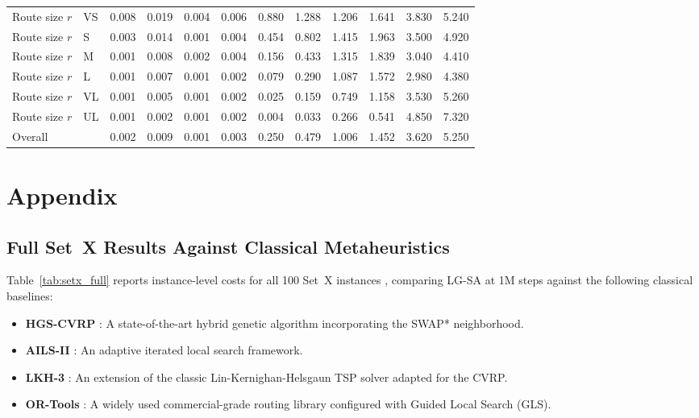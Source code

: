 \documentclass[letterpaper]{article} %
\begin{document}
\begin{table}[t]
\begin{tabular}{llrrrrrrrrrr}
Route size $r$ & VS & 0.008 & 0.019 & 0.004 & 0.006 & 0.880 & 1.288 & 1.206 & 1.641 & 3.830 & 5.240 \\
Route size $r$ & S & 0.003 & 0.014 & 0.001 & 0.004 & 0.454 & 0.802 & 1.415 & 1.963 & 3.500 & 4.920 \\
Route size $r$ & M & 0.001 & 0.008 & 0.002 & 0.004 & 0.156 & 0.433 & 1.315 & 1.839 & 3.040 & 4.410 \\
Route size $r$ & L & 0.001 & 0.007 & 0.001 & 0.002 & 0.079 & 0.290 & 1.087 & 1.572 & 2.980 & 4.380 \\
Route size $r$ & VL & 0.001 & 0.005 & 0.001 & 0.002 & 0.025 & 0.159 & 0.749 & 1.158 & 3.530 & 5.260 \\
Route size $r$ & UL & 0.001 & 0.002 & 0.001 & 0.002 & 0.004 & 0.033 & 0.266 & 0.541 & 4.850 & 7.320 \\
Overall &  & 0.002 & 0.009 & 0.001 & 0.003 & 0.250 & 0.479 & 1.006 & 1.452 & 3.620 & 5.250 \\
\bottomrule
\end{tabular}

\end{table}

\newpage



\newpage
\section{Appendix}

\subsection{Full Set~X Results Against Classical Metaheuristics}
\label{app:setx_full}

Table~\ref{tab:setx_full} reports instance-level costs for all 100 Set~X instances \citep{uchoa_new_2017}, comparing LG-SA at 1M steps against the following classical baselines:
\begin{itemize}
    \item \textbf{HGS-CVRP} \citep{vidal_hybrid_2022}: A state-of-the-art hybrid genetic algorithm incorporating the SWAP* neighborhood.
    \item \textbf{AILS-II} \citep{maximo_adaptive_2021}: An adaptive iterated local search framework.
    \item \textbf{LKH-3} \citep{helsgaun_extension_2017}: An extension of the classic Lin-Kernighan-Helsgaun TSP solver adapted for the CVRP.
    \item \textbf{OR-Tools} \citep{ortools_routing}: A widely used commercial-grade routing library configured with Guided Local Search (GLS).
\end{itemize}
\end{document}
